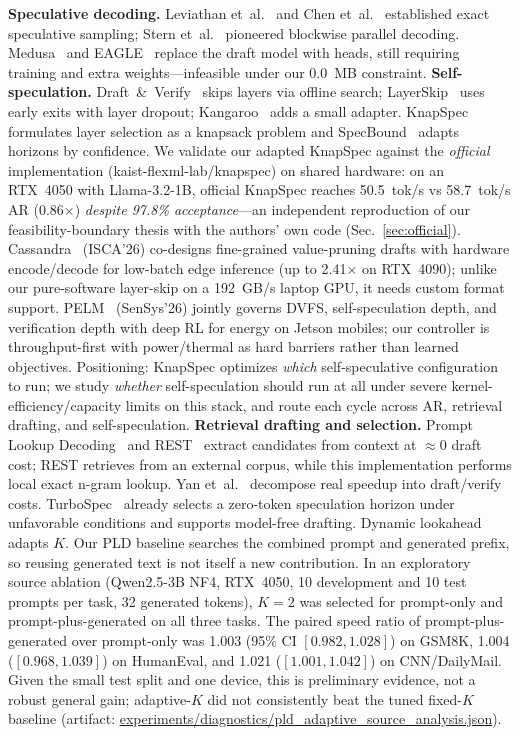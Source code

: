 \documentclass[10pt,twocolumn,letterpaper]{article}
\begin{document}
\textbf{Speculative decoding.} Leviathan et~al.~\cite{leviathan2023fast} and Chen et~al.~\cite{chen2023accelerating} established exact speculative sampling; Stern et~al.~\cite{stern2018blockwise} pioneered blockwise parallel decoding. Medusa~\cite{cai2024medusa} and EAGLE~\cite{li2024eagle} replace the draft model with heads, still requiring training and extra weights---infeasible under our 0.0~MB constraint.
\textbf{Self-speculation.} Draft~\&~Verify~\cite{zhang2024draft} skips layers via offline search; LayerSkip~\cite{elhoushi2024layerskip} uses early exits with layer dropout; Kangaroo~\cite{liu2024kangaroo} adds a small adapter. KnapSpec~\cite{knapspec2026} formulates layer selection as a knapsack problem and SpecBound~\cite{specbound2026} adapts horizons by confidence. We validate our adapted KnapSpec against the \textit{official} implementation (kaist-flexml-lab/knapspec) on shared hardware: on an RTX~4050 with Llama-3.2-1B, official KnapSpec reaches 50.5~tok/s vs 58.7~tok/s AR (0.86$\times$) \textit{despite 97.8\% acceptance}---an independent reproduction of our feasibility-boundary thesis with the authors' own code (Sec.~\ref{sec:official}). Cassandra~\cite{choi2026cassandra} (ISCA'26) co-designs fine-grained value-pruning drafts with hardware encode/decode for low-batch edge inference (up to 2.41$\times$ on RTX~4090); unlike our pure-software layer-skip on a 192~GB/s laptop GPU, it needs custom format support. PELM~\cite{yang2026pelm} (SenSys'26) jointly governs DVFS, self-speculation depth, and verification depth with deep RL for energy on Jetson mobiles; our controller is throughput-first with power/thermal as hard barriers rather than learned objectives. Positioning: KnapSpec optimizes \textit{which} self-speculative configuration to run; we study \textit{whether} self-speculation should run at all under severe kernel-efficiency/capacity limits on this stack, and route each cycle across AR, retrieval drafting, and self-speculation.
\textbf{Retrieval drafting and selection.} Prompt Lookup Decoding~\cite{saxena2024prompt} and REST~\cite{he2024rest} extract candidates from context at $\approx$0 draft cost; REST retrieves from an external corpus, while this implementation performs local exact n-gram lookup. Yan et~al.~\cite{yan2025decoding} decompose real speedup into draft/verify costs. TurboSpec~\cite{turbospec2025} already selects a zero-token speculation horizon under unfavorable conditions and supports model-free drafting. Dynamic lookahead~\cite{mamou2024lookahead} adapts $K$. Our PLD baseline searches the combined prompt and generated prefix, so reusing generated text is not itself a new contribution. In an exploratory source ablation (Qwen2.5-3B NF4, RTX~4050, 10 development and 10 test prompts per task, 32 generated tokens), $K{=}2$ was selected for prompt-only and prompt-plus-generated on all three tasks. The paired speed ratio of prompt-plus-generated over prompt-only was 1.003 (95\% CI $[0.982,1.028]$) on GSM8K, 1.004 ($[0.968,1.039]$) on HumanEval, and 1.021 ($[1.001,1.042]$) on CNN/DailyMail. Given the small test split and one device, this is preliminary evidence, not a robust general gain; adaptive-$K$ did not consistently beat the tuned fixed-$K$ baseline (artifact: \url{experiments/diagnostics/pld_adaptive_source_analysis.json}).
\end{document}
